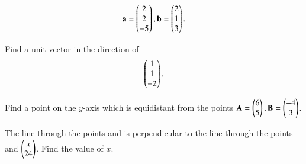 %
\begin{align}
\mathbf{a} = \begin{pmatrix}2\\2\\-5\end{pmatrix}, \mathbf{b} = \begin{pmatrix}2\\1\\3\end{pmatrix}.
\end{align}
%
\item Find a unit vector in the direction of 
%
\begin{align}
\begin{pmatrix}1\\1\\-2\end{pmatrix}.
\end{align}
%
\item Find a point on the $y$-axis which is equidistant from the points $\mathbf{A} = \begin{pmatrix}6\\5\end{pmatrix}, \mathbf{B} = \begin{pmatrix}-4\\3\end{pmatrix}$.

\item The line through the points  and  is perpendicular to the line through the points  and $\begin{pmatrix}x\\24\end{pmatrix}$.  Find the value of $x$.

%

